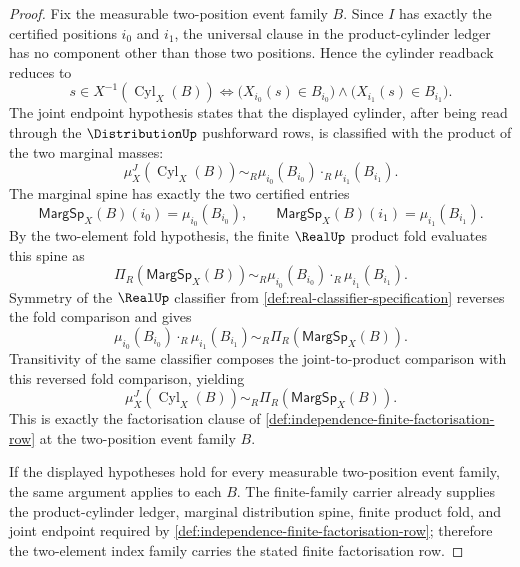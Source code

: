 \begin{proof}
Fix the measurable two-position event family $B$. Since $I$ has exactly the certified positions $i_0$ and $i_1$, the universal clause in the product-cylinder ledger has no component other than those two positions. Hence the cylinder readback reduces to
$$
s\in X^{-1}(\operatorname{Cyl}_X(B))
\Longleftrightarrow
\bigl(X_{i_0}(s)\in B_{i_0}\bigr)\land\bigl(X_{i_1}(s)\in B_{i_1}\bigr).
$$
The joint endpoint hypothesis states that the displayed cylinder, after being read through the $\DistributionUp$ pushforward rows, is classified with the product of the two marginal masses:
$$
\mu_X^J(\operatorname{Cyl}_X(B))
\sim_R
\mu_{i_0}(B_{i_0})\cdot_R\mu_{i_1}(B_{i_1}).
$$
The marginal spine has exactly the two certified entries
$$
\mathsf{MargSp}_X(B)(i_0)=\mu_{i_0}(B_{i_0}),
\qquad
\mathsf{MargSp}_X(B)(i_1)=\mu_{i_1}(B_{i_1}).
$$
By the two-element fold hypothesis, the finite $\RealUp$ product fold evaluates this spine as
$$
\Pi_R(\mathsf{MargSp}_X(B))
\sim_R
\mu_{i_0}(B_{i_0})\cdot_R\mu_{i_1}(B_{i_1}).
$$
Symmetry of the $\RealUp$ classifier from \autoref{def:real-classifier-specification} reverses the fold comparison and gives
$$
\mu_{i_0}(B_{i_0})\cdot_R\mu_{i_1}(B_{i_1})
\sim_R
\Pi_R(\mathsf{MargSp}_X(B)).
$$
Transitivity of the same classifier composes the joint-to-product comparison with this reversed fold comparison, yielding
$$
\mu_X^J(\operatorname{Cyl}_X(B))\sim_R\Pi_R(\mathsf{MargSp}_X(B)).
$$
This is exactly the factorisation clause of \autoref{def:independence-finite-factorisation-row} at the two-position event family $B$.

If the displayed hypotheses hold for every measurable two-position event family, the same argument applies to each $B$. The finite-family carrier already supplies the product-cylinder ledger, marginal distribution spine, finite product fold, and joint endpoint required by \autoref{def:independence-finite-factorisation-row}; therefore the two-element index family carries the stated finite factorisation row.
\end{proof}
